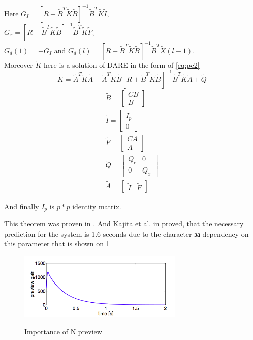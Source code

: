 \documentclass[12pt,a4paper]{report}
\begin{document}
			Here $G_I = [R+\tilde{B}^T \tilde{K} \tilde{B}]^{-1} \tilde{B}^T \tilde{K} \tilde{I}$, \\$G_x = [R+\tilde{B}^T \tilde{K} \tilde{B}]^{-1} \tilde{B}^T \tilde{K} \tilde{F}$,\\
			$G_d(1) = -G_I$ and $G_d(l) = [R+\tilde{B}^T \tilde{K} \tilde{B}]^{-1} \tilde{B}^T \tilde{X}(l-1)$.\\
			Moreover $\tilde{K}$ here is a solution of DARE in the form of \ref{eq:pc2}
			\begin{equation}\label{eq:pc2}
				\tilde{K} = \tilde{A}^T\tilde{K}\tilde{A} - \tilde{A}^T \tilde{K} \tilde{B} [R + \tilde{B}^T \tilde{K} \tilde{B}]^{-1} \tilde{B}^T\tilde{K}\tilde{A} + \tilde{Q}
			\end{equation}
			\begin{equation}\label{eq:pc3}
				\begin{split}
					\tilde{B} = \begin{bmatrix} C B \\ B \end{bmatrix}\\
					\tilde{I} = \begin{bmatrix} I_p \\ 0 \end{bmatrix}\\
					\tilde{F} = \begin{bmatrix} CA \\ A \end{bmatrix}\\
					\tilde{Q} = \begin{bmatrix} Q_e & 0 \\ 0 & Q_x \end{bmatrix}\\
					\tilde{A} = \begin{bmatrix} \tilde{I} & \tilde{F} \end{bmatrix}
				\end{split}
			\end{equation}
			
			And finally $I_p$ is $p * p$ identity matrix.
			
			This theorem was proven in \cite{katayama1985design}. And Kajita et al. in \cite{kajita2003biped} proved, that the necessary prediction for the system is 1.6 seconds due to the character за dependency on this parameter that is shown on \cref{fig:12} 
			
			\begin{figure}[h!]
				\vspace{-0.2cm}
				\centering
				{\includegraphics[width=0.7\textwidth]{12}}
				\caption{Importance of N preview \cite{kajita2003biped}}
				\label{fig:12}
				\vspace{-0.1cm}
			\end{figure}
\end{document}
